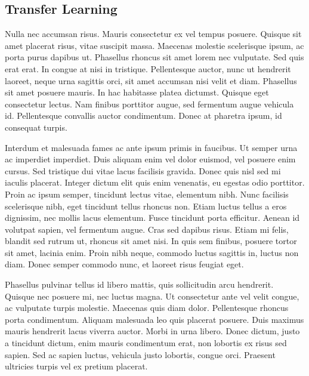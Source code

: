 \subsection{Transfer Learning} %
\label{sub:amet}
Nulla nec accumsan risus. Mauris consectetur ex vel tempus posuere. Quisque sit amet placerat risus, vitae suscipit massa. Maecenas molestie scelerisque ipsum, ac porta purus dapibus ut. Phasellus rhoncus sit amet lorem nec vulputate. Sed quis erat erat. In congue at nisi in tristique. Pellentesque auctor, nunc ut hendrerit laoreet, neque urna sagittis orci, sit amet accumsan nisi velit et diam. Phasellus sit amet posuere mauris. In hac habitasse platea dictumst. Quisque eget consectetur lectus. Nam finibus porttitor augue, sed fermentum augue vehicula id. Pellentesque convallis auctor condimentum. Donec at pharetra ipsum, id consequat turpis.

Interdum et malesuada fames ac ante ipsum primis in faucibus. Ut semper urna ac imperdiet imperdiet. Duis aliquam enim vel dolor euismod, vel posuere enim cursus. Sed tristique dui vitae lacus facilisis gravida. Donec quis nisl sed mi iaculis placerat. Integer dictum elit quis enim venenatis, eu egestas odio porttitor. Proin ac ipsum semper, tincidunt lectus vitae, elementum nibh. Nunc facilisis scelerisque nibh, eget tincidunt tellus rhoncus non. Etiam luctus tellus a eros dignissim, nec mollis lacus elementum. Fusce tincidunt porta efficitur. Aenean id volutpat sapien, vel fermentum augue. Cras sed dapibus risus. Etiam mi felis, blandit sed rutrum ut, rhoncus sit amet nisi. In quis sem finibus, posuere tortor sit amet, lacinia enim. Proin nibh neque, commodo luctus sagittis in, luctus non diam. Donec semper commodo nunc, et laoreet risus feugiat eget.

Phasellus pulvinar tellus id libero mattis, quis sollicitudin arcu hendrerit. Quisque nec posuere mi, nec luctus magna. Ut consectetur ante vel velit congue, ac vulputate turpis molestie. Maecenas quis diam dolor. Pellentesque rhoncus porta condimentum. Aliquam malesuada leo quis placerat posuere. Duis maximus mauris hendrerit lacus viverra auctor. Morbi in urna libero. Donec dictum, justo a tincidunt dictum, enim mauris condimentum erat, non lobortis ex risus sed sapien. Sed ac sapien luctus, vehicula justo lobortis, congue orci. Praesent ultricies turpis vel ex pretium placerat.

